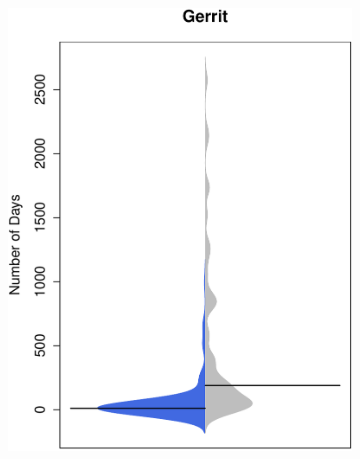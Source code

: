 \begin{figure}[t]
\begin{subfigure}[b]{0.20\textwidth}
		\includegraphics[width=\textwidth]{figures/test/gerrit_update.pdf}
		\label{fig:removal_comparison_tomcat} 
	\end{subfigure}
	 ~ 
	 ~
	 ~ 
	 \begin{subfigure}[b]{0.20\textwidth}

\end{subfigure}
\end{figure}
